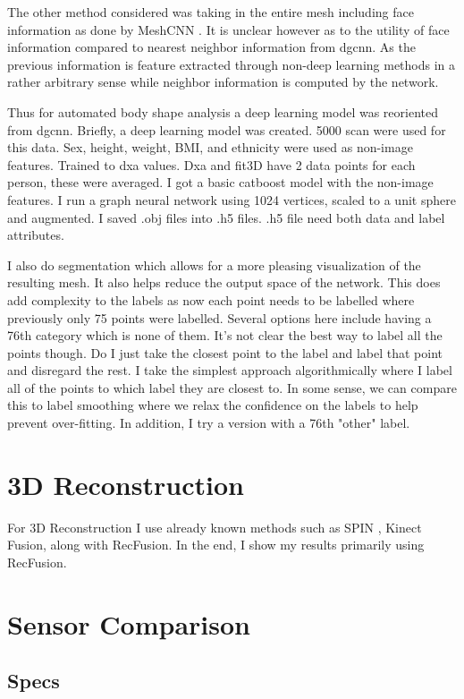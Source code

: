 The other method considered was taking in the entire mesh including face information as done by MeshCNN \cite{hanocka2019meshcnn}. It is unclear however as to the utility of face information compared to nearest neighbor information from dgcnn. As the previous information is feature extracted through non-deep learning methods in a rather arbitrary sense while neighbor information is computed by the network.

Thus for automated body shape analysis a deep learning model was reoriented from dgcnn. Briefly, a deep learning model was created. 5000 scan were used for this data. Sex, height, weight, BMI, and ethnicity were used as non-image features. Trained to dxa values. Dxa and fit3D have 2 data points for each person, these were averaged. I got a basic catboost model with the non-image features. I run a graph neural network using 1024 vertices, scaled to a unit sphere and augmented. I saved .obj files into .h5 files. .h5 file need both data and label attributes. 

I also do segmentation which allows for a more pleasing visualization of the resulting mesh. It also helps reduce the output space of the network. This does add complexity to the labels as now each point needs to be labelled where previously only 75 points were labelled. Several options here include having a 76th category which is none of them. It's not clear the best way to label all the points though. Do I just take the closest point to the label and label that point and disregard the rest. I take the simplest approach algorithmically where I label all of the points to which label they are closest to. In some sense, we can compare this to label smoothing where we relax the confidence on the labels to help prevent over-fitting. In addition, I try a version with a 76th "other" label.

\section{3D Reconstruction}
For 3D Reconstruction I use already known methods such as SPIN \cite{kolotouros2019learning} , Kinect Fusion, along with RecFusion. In the end, I show my results primarily using RecFusion.
\section{Sensor Comparison}

\subsection{Specs}

